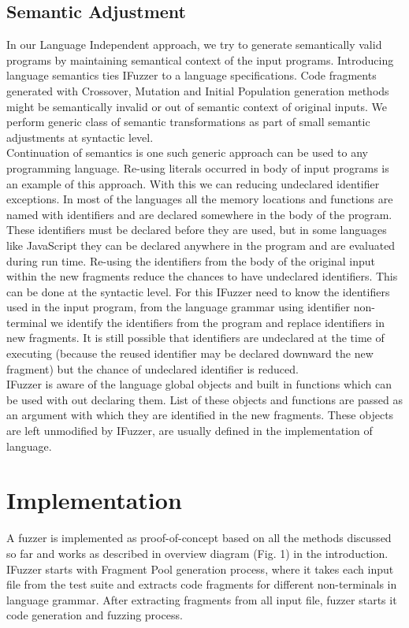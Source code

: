 \documentclass{sig-alternate}
\begin{document}
\subsection{Semantic Adjustment} \label{sec:semantics}
\indent In our Language Independent approach, we try to generate semantically valid programs by maintaining semantical context of the input programs. Introducing language semantics ties IFuzzer to a language specifications. Code fragments generated with Crossover, Mutation and Initial Population generation   methods might be semantically invalid or out of semantic context of original inputs. We perform generic class of semantic transformations as part of small semantic adjustments at syntactic level. \\
\indent Continuation of semantics is one such generic approach can be used to any programming language. Re-using literals occurred in body of input programs is an example of this approach. With this we can reducing undeclared identifier exceptions. In most of the languages all the memory locations and functions are named with identifiers and are declared somewhere in the body of the program. These identifiers must be declared before they are used, but in some languages like JavaScript they can be declared anywhere in the program and are evaluated during run time. Re-using the identifiers from the body of the original input within the new fragments reduce the chances to have undeclared identifiers. This can be done at the syntactic level. For this IFuzzer need to know the identifiers used in the input program, from the language grammar using identifier non-terminal we identify the identifiers from the program and replace identifiers in new fragments. It is still possible that identifiers are undeclared at the time of executing (because the reused identifier may be declared downward the new fragment) but the chance of undeclared identifier is reduced. \\
\indent IFuzzer is aware of the language global objects and built in functions which can be used with out declaring them. List of these objects and functions are passed as an argument with which they are identified in the new fragments. These objects are left unmodified by IFuzzer, are usually defined in the implementation of language.

\section{Implementation} \label{sec:impl}
\indent A fuzzer is implemented as proof-of-concept based on all the methods discussed so far and works as described in overview diagram (Fig. 1) in the introduction. IFuzzer starts with Fragment Pool generation process, where it takes each input file from the test suite and extracts code fragments for different non-terminals in language grammar.
After extracting fragments from all input file, fuzzer starts it code generation and fuzzing process.
\end{document}
